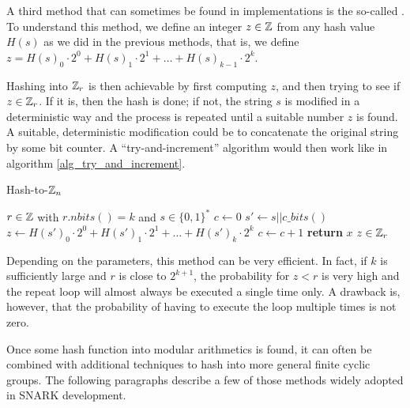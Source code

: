 A third method that can sometimes be found in implementations is the so-called . To understand this method, we define an integer $z\in\mathbb{Z}$ from any hash value $H(s)$ as we did in the previous methods, that is, we define $z = H(s)_0\cdot 2^0 + H(s)_1\cdot 2^1 + \ldots + H(s)_{k-1}\cdot 2^{k}$.

Hashing into $\mathbb{Z}_r$ is then achievable by first computing $z$, and then trying to see if $z\in\mathbb{Z}_r$. If it is, then the hash is done; if not, the string $s$ is modified in a deterministic way and the process is repeated until a suitable number $z$ is found. A suitable, deterministic modification could be to concatenate the original string by some bit counter. A ``try-and-increment'' algorithm would then work like in algorithm \ref{alg_try_and_increment}.
\begin{algorithm}\caption{Hash-to-$\mathbb{Z}_n$}
\label{alg_try_and_increment}
\begin{algorithmic}[0]
\Require $r \in \mathbb{Z}$ with $r.nbits()=k$ and $s\in\{0,1\}^*$
\State $c \gets 0$
\Repeat
\State $s' \gets s||c\_bits()$
\State $z \gets H(s')_0\cdot 2^0 + H(s')_1\cdot 2^1 + \ldots + H(s')_{k}\cdot 2^{k}$
\State $c\gets c+1$
\State \textbf{return} $x$
\EndProcedure
\Ensure $ z\in \mathbb{Z}_r$
\end{algorithmic}
\end{algorithm}

Depending on the parameters, this method can be very efficient. In fact, if $k$ is sufficiently large and $r$ is close to $2^{k+1}$, the probability for $z<r$ is very high and the repeat loop will almost always be executed a single time only. A drawback is, however, that the probability of having to execute the loop multiple times is not zero.

Once some hash function into modular arithmetics is found, it can often be combined with additional techniques to hash into more general finite cyclic groups. The following paragraphs describe a few of those methods widely adopted in SNARK development.\label{hashing-end}

